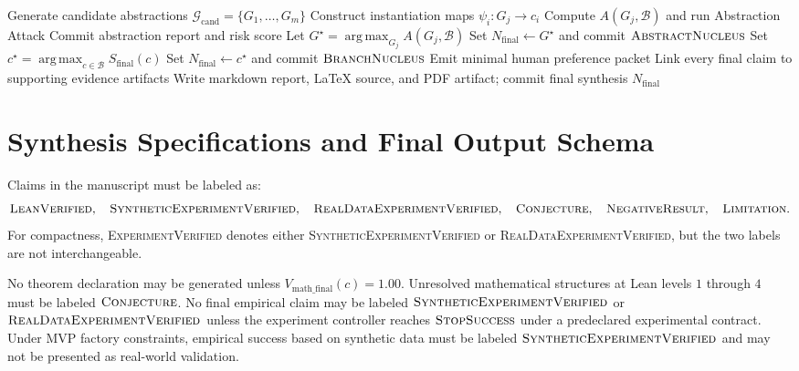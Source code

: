 \documentclass[11pt]{article}
\begin{document}
\begin{algorithm}[H]
\footnotesize
\caption{Abstract Synthesis and Final Output Selection}
\begin{algorithmic}[1]
\State Generate candidate abstractions $\mathcal{G}_{\text{cand}}=\{G_1,\dots,G_m\}$
    \State Construct instantiation maps $\psi_i:G_j\rightarrow c_i$
    \State Compute $A(G_j,\mathcal{B})$ and run Abstraction Attack
    \State Commit abstraction report and risk score
\EndFor
\State Let $G^\star=\operatorname*{arg\,max}_{G_j}A(G_j,\mathcal{B})$
    \State Set $N_{\text{final}}\gets G^\star$ and commit $\textsc{AbstractNucleus}$
\Else
    \State Set $c^\star=\operatorname*{arg\,max}_{c\in\mathcal{B}}S_{\text{final}}(c)$
    \State Set $N_{\text{final}}\gets c^\star$ and commit $\textsc{BranchNucleus}$
\EndIf
{}
    \State Emit minimal human preference packet
\EndIf
\State Link every final claim to supporting evidence artifacts
\State Write markdown report, LaTeX source, and PDF artifact; commit final synthesis
\State \Return $N_{\text{final}}$
\EndFunction
\end{algorithmic}
\end{algorithm}

\section{Synthesis Specifications and Final Output Schema}

Claims in the manuscript must be labeled as:
$$
\textsc{LeanVerified}, \quad
\textsc{SyntheticExperimentVerified}, \quad
\textsc{RealDataExperimentVerified}, \quad
\textsc{Conjecture}, \quad
\textsc{NegativeResult}, \quad
\textsc{Limitation}.
$$
For compactness, \textsc{ExperimentVerified} denotes either \textsc{SyntheticExperimentVerified} or \textsc{RealDataExperimentVerified}, but the two labels are not interchangeable.

No theorem declaration may be generated unless $V_{\text{math\_final}}(c)=1.00$. Unresolved mathematical structures at Lean levels $1$ through $4$ must be labeled $\textsc{Conjecture}$. No final empirical claim may be labeled $\textsc{SyntheticExperimentVerified}$ or $\textsc{RealDataExperimentVerified}$ unless the experiment controller reaches $\textsc{StopSuccess}$ under a predeclared experimental contract. Under MVP factory constraints, empirical success based on synthetic data must be labeled $\textsc{SyntheticExperimentVerified}$ and may not be presented as real-world validation.
\end{document}
